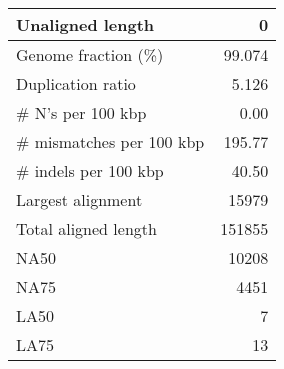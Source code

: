 \documentclass[12pt,a4paper]{article}
\begin{document}
\begin{table}[ht]
\begin{center}
\begin{tabular}{|l*{1}{|r}|}
Unaligned length & 0 \\ \hline
Genome fraction (\%) & 99.074 \\ \hline
Duplication ratio & 5.126 \\ \hline
\# N's per 100 kbp & 0.00 \\ \hline
\# mismatches per 100 kbp & 195.77 \\ \hline
\# indels per 100 kbp & 40.50 \\ \hline
Largest alignment & 15979 \\ \hline
Total aligned length & 151855 \\ \hline
NA50 & 10208 \\ \hline
NA75 & 4451 \\ \hline
LA50 & 7 \\ \hline
LA75 & 13 \\ \hline
\end{tabular}
\end{center}
\end{table}
\end{document}
